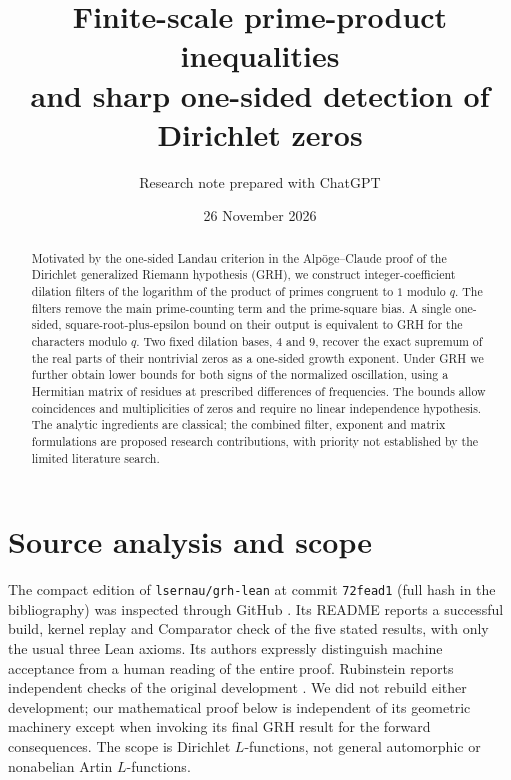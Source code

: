 \documentclass[11pt]{article}
\title{Finite-scale prime-product inequalities\\and sharp one-sided detection of Dirichlet zeros}
\author{Research note prepared with ChatGPT}
\date{26 November 2026}
\theoremstyle{definition}\newtheorem{definition}[theorem]{Definition}
\begin{document}
\maketitle
\begin{abstract}
Motivated by the one-sided Landau criterion in the Alp\"oge--Claude proof of the Dirichlet generalized Riemann hypothesis (GRH), we construct integer-coefficient dilation filters of the logarithm of the product of primes congruent to $1$ modulo $q$. The filters remove the main prime-counting term and the prime-square bias. A single one-sided, square-root-plus-epsilon bound on their output is equivalent to GRH for the characters modulo $q$. Two fixed dilation bases, $4$ and $9$, recover the exact supremum of the real parts of their nontrivial zeros as a one-sided growth exponent. Under GRH we further obtain lower bounds for both signs of the normalized oscillation, using a Hermitian matrix of residues at prescribed differences of frequencies. The bounds allow coincidences and multiplicities of zeros and require no linear independence hypothesis. The analytic ingredients are classical; the combined filter, exponent and matrix formulations are proposed research contributions, with priority not established by the limited literature search.
\end{abstract}

\section{Source analysis and scope}
The compact edition of \texttt{lsernau/grh-lean} at commit
\texttt{72fead1} (full hash in the bibliography) was inspected through GitHub \cite{sernau}. Its README reports a successful build, kernel replay and Comparator check of the five stated results, with only the usual three Lean axioms. Its authors expressly distinguish machine acceptance from a human reading of the entire proof. Rubinstein reports independent checks of the original development \cite{rubinstein}. We did not rebuild either development; our mathematical proof below is independent of its geometric machinery except when invoking its final GRH result for the forward consequences. The scope is Dirichlet $L$-functions, not general automorphic or nonabelian Artin $L$-functions.
\end{document}
